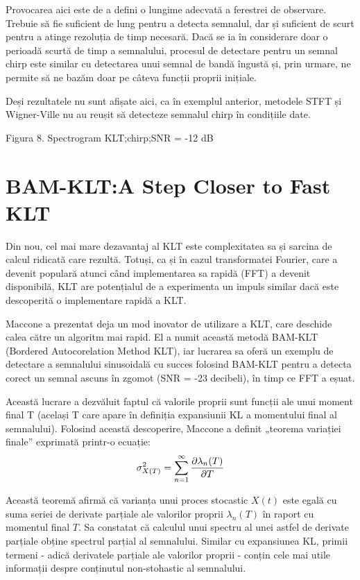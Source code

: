 \documentclass[12pt]{report}
\begin{document}
Provocarea aici este de a defini o lungime adecvată a ferestrei de observare. Trebuie să fie suficient de lung pentru a detecta semnalul, dar și suficient de scurt pentru a atinge rezoluția de timp necesară. Dacă se ia în considerare doar o perioadă scurtă de timp a semnalului, procesul de detectare pentru un semnal chirp este similar cu detectarea unui semnal de bandă îngustă și, prin urmare, ne permite să ne bazăm doar pe câteva funcții proprii inițiale.

Deși rezultatele nu sunt afișate aici, ca în exemplul anterior, metodele STFT și Wigner-Ville nu au reușit să detecteze semnalul chirp în condițiile date.
\begin{center}
	\color{red}Figura 8. Spectrogram KLT;\@ chirp;\@ SNR = -12 dB
\end{center}

\section*{BAM-KLT:\@ A Step Closer to Fast KLT}

Din nou, cel mai mare dezavantaj al KLT este complexitatea sa și sarcina de calcul ridicată care rezultă. Totuși, ca și în cazul transformatei Fourier, care a devenit populară atunci când implementarea sa rapidă (FFT) a devenit disponibilă, KLT are potențialul de a experimenta un impuls similar dacă este descoperită o implementare rapidă a KLT.

Maccone a prezentat deja un mod inovator de utilizare a KLT, care deschide calea către un algoritm mai rapid. El a numit această metodă BAM-KLT (Bordered Autocorelation Method KLT), iar lucrarea sa oferă un exemplu de detectare a semnalului sinusoidală cu succes folosind BAM-KLT pentru a detecta corect un semnal ascuns în zgomot (SNR = -23 decibeli), în timp ce FFT a eșuat.

Această lucrare a dezvăluit faptul că valorile proprii sunt funcții ale unui moment final T (același T care apare în definiția expansiunii KL a momentului final al semnalului). Folosind această descoperire, Maccone a definit „teorema variației finale” exprimată printr-o ecuație:
\begin{equation}
	\sigma_{X(T)}^2=\sum_{n=1}^{\infty}\pdv{\lambda_n(T)}{T}
	\label{eq:8}
\end{equation}

Această teoremă afirmă că varianța unui proces stocastic $X(t)$ este egală cu suma seriei de derivate parțiale ale valorilor proprii $\lambda_n(T)$ în raport cu momentul final $T$. Sa constatat că calculul unui spectru al unei astfel de derivate parțiale obține spectrul parțial al semnalului. Similar cu expansiunea KL, primii termeni - adică derivatele parțiale ale valorilor proprii - conțin cele mai utile informații despre conținutul non-stohastic al semnalului.
\end{document}
